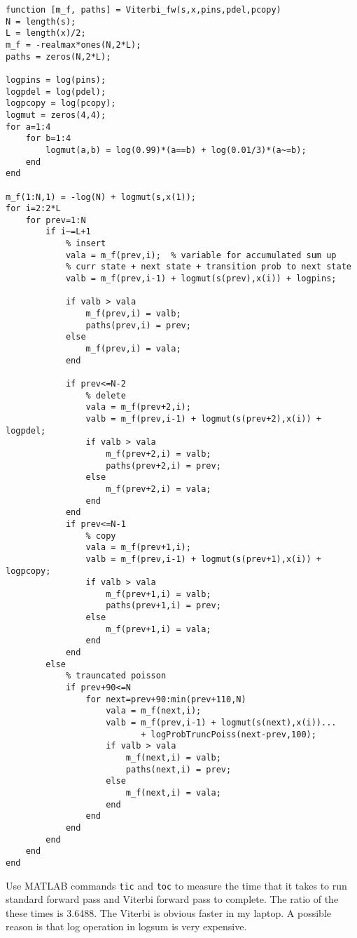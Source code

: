 \documentclass{article}
\begin{document}
\begin{verbatim}
function [m_f, paths] = Viterbi_fw(s,x,pins,pdel,pcopy)
N = length(s);
L = length(x)/2;
m_f = -realmax*ones(N,2*L);
paths = zeros(N,2*L);

logpins = log(pins);
logpdel = log(pdel);
logpcopy = log(pcopy);
logmut = zeros(4,4);
for a=1:4
    for b=1:4
        logmut(a,b) = log(0.99)*(a==b) + log(0.01/3)*(a~=b);
    end
end

m_f(1:N,1) = -log(N) + logmut(s,x(1));
for i=2:2*L
    for prev=1:N
        if i~=L+1
            % insert
            vala = m_f(prev,i);  % variable for accumulated sum up             
            % curr state + next state + transition prob to next state            
            valb = m_f(prev,i-1) + logmut(s(prev),x(i)) + logpins;
            
            if valb > vala
                m_f(prev,i) = valb;
                paths(prev,i) = prev;
            else
                m_f(prev,i) = vala;
            end
            
            if prev<=N-2
                % delete
                vala = m_f(prev+2,i);
                valb = m_f(prev,i-1) + logmut(s(prev+2),x(i)) + logpdel;
                if valb > vala
                    m_f(prev+2,i) = valb;
                    paths(prev+2,i) = prev;
                else
                    m_f(prev+2,i) = vala;
                end
            end
            if prev<=N-1
                % copy
                vala = m_f(prev+1,i);
                valb = m_f(prev,i-1) + logmut(s(prev+1),x(i)) + logpcopy;
                if valb > vala
                    m_f(prev+1,i) = valb;
                    paths(prev+1,i) = prev;
                else
                    m_f(prev+1,i) = vala;
                end
            end
        else
            % trauncated poisson
            if prev+90<=N
                for next=prev+90:min(prev+110,N)
                    vala = m_f(next,i);
                    valb = m_f(prev,i-1) + logmut(s(next),x(i))...
                           + logProbTruncPoiss(next-prev,100);
                    if valb > vala
                        m_f(next,i) = valb;
                        paths(next,i) = prev;
                    else
                        m_f(next,i) = vala;
                    end
                end
            end
        end
    end
end
\end{verbatim}

\newproblem{2pt} Use MATLAB commands {\tt tic} and {\tt toc} to measure the time that it takes to run standard forward pass and Viterbi forward pass to complete. The ratio of the these times is 3.6488. The Viterbi is obvious faster in my laptop. A possible reason is that log operation in logsum is very expensive.
\end{document}
